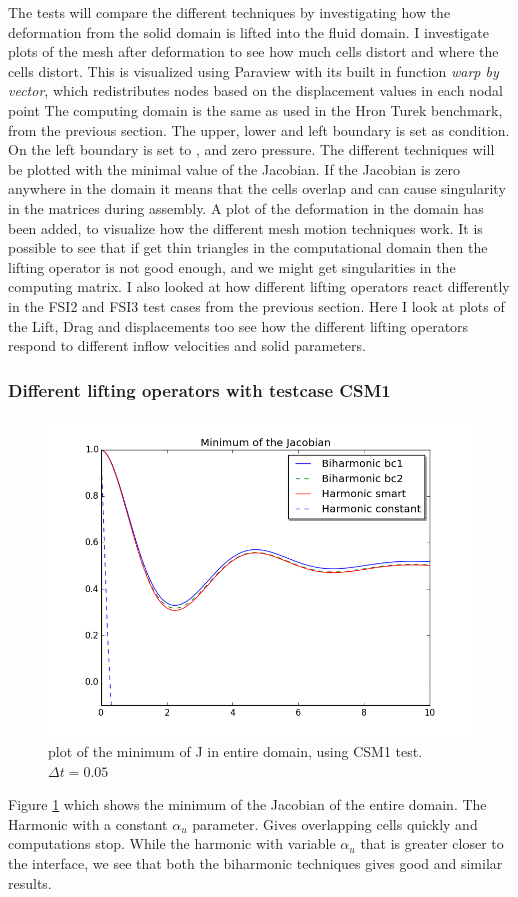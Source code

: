 The tests will compare the different techniques by investigating how the deformation from the solid domain is lifted into the fluid domain. I investigate plots of the mesh after deformation to see how much cells distort and where the cells distort. This is visualized using Paraview with its built in function \textit{warp by vector}, which redistributes nodes based on the displacement values in each nodal point
The computing domain is the same as used in the Hron Turek benchmark, from the previous section.
The upper, lower and left boundary is set as  condition. On the left boundary is set to , and zero pressure.
The different techniques will be plotted with the minimal value of the Jacobian. If the Jacobian is zero anywhere in the domain it means that the cells overlap and can cause singularity in the matrices during assembly.
A plot of the deformation in the domain has been added, to visualize how the different mesh motion techniques work. It is possible to see that if get thin triangles in the computational domain then the lifting operator is not good enough, and we might get singularities in the computing matrix.
I also looked at how different lifting operators react differently in the FSI2 and FSI3 test cases from the previous section. Here I look at plots of the Lift, Drag and displacements too see how the different lifting operators respond to different inflow velocities and solid parameters.

\subsubsection*{Different lifting operators with testcase CSM1}
\begin{figure}[H]
  \label{fig:fluid_structure}
  \includegraphics[scale=0.60, trim={0mm 0mm 0mm 0mm},clip]{./Mesh_motion_results/CSM1.png}
   \caption{plot of the minimum of J in entire domain, using CSM1 test. $\Delta t = 0.05$}
\end{figure}
Figure \ref{fig:fluid_structure} which shows the minimum of the Jacobian of the entire domain. The Harmonic with a constant $\alpha_u$ parameter. Gives overlapping cells quickly and computations stop.
While the harmonic with variable $\alpha_u$ that is greater closer to the interface, we see that both the biharmonic techniques gives good and similar results.

